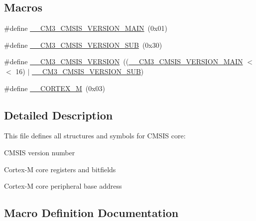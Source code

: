\subsection*{Macros}
\begin{DoxyCompactItemize}
\item 
\#define \hyperlink{group__CMSIS__CM3__core__definitions_gac1c1120e9fe082fac8225c60143ac79a}{\+\_\+\+\_\+\+C\+M3\+\_\+\+C\+M\+S\+I\+S\+\_\+\+V\+E\+R\+S\+I\+O\+N\+\_\+\+M\+A\+IN}~(0x01)
\item 
\#define \hyperlink{group__CMSIS__CM3__core__definitions_ga9ff7a998d4b8b3c87bfaca6e78607950}{\+\_\+\+\_\+\+C\+M3\+\_\+\+C\+M\+S\+I\+S\+\_\+\+V\+E\+R\+S\+I\+O\+N\+\_\+\+S\+UB}~(0x30)
\item 
\#define \hyperlink{group__CMSIS__CM3__core__definitions_gaf888c651cd8c93fd25364f9e74306a1c}{\+\_\+\+\_\+\+C\+M3\+\_\+\+C\+M\+S\+I\+S\+\_\+\+V\+E\+R\+S\+I\+ON}~((\hyperlink{group__CMSIS__CM3__core__definitions_gac1c1120e9fe082fac8225c60143ac79a}{\+\_\+\+\_\+\+C\+M3\+\_\+\+C\+M\+S\+I\+S\+\_\+\+V\+E\+R\+S\+I\+O\+N\+\_\+\+M\+A\+IN} $<$$<$ 16) $\vert$ \hyperlink{group__CMSIS__CM3__core__definitions_ga9ff7a998d4b8b3c87bfaca6e78607950}{\+\_\+\+\_\+\+C\+M3\+\_\+\+C\+M\+S\+I\+S\+\_\+\+V\+E\+R\+S\+I\+O\+N\+\_\+\+S\+UB})
\item 
\#define \hyperlink{group__CMSIS__CM3__core__definitions_ga63ea62503c88acab19fcf3d5743009e3}{\+\_\+\+\_\+\+C\+O\+R\+T\+E\+X\+\_\+M}~(0x03)
\end{DoxyCompactItemize}


\subsection{Detailed Description}
This file defines all structures and symbols for C\+M\+S\+IS core\+:
\begin{DoxyItemize}
\item C\+M\+S\+IS version number
\item Cortex-\/M core registers and bitfields
\item Cortex-\/M core peripheral base address 
\end{DoxyItemize}

\subsection{Macro Definition Documentation}
